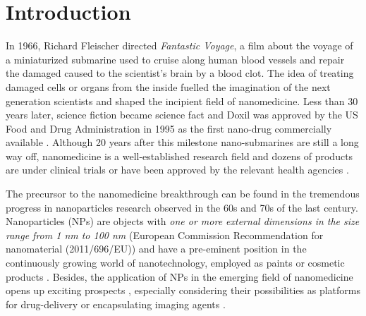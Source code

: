 \chapter{Introduction}
\label{chap:introduction}


In 1966, Richard Fleischer directed \emph{Fantastic Voyage}, a film about the voyage of a miniaturized submarine used to cruise along human blood vessels and repair the damaged caused to the scientist's brain by a blood clot. The idea of treating damaged cells or organs from the inside fuelled the imagination of the next generation scientists and shaped the incipient field of nanomedicine. Less than 30 years later, science fiction became science fact and Doxil was approved by the US Food and Drug Administration in 1995 as the first nano-drug commercially available \citep{barenholz_doxil-first_2012}. Although 20 years after this milestone nano-submarines are still a long way off, nanomedicine is a well-established research field and dozens of products are under clinical trials or have been approved by the relevant health agencies \citep{etheridge_big_2013}.

The precursor to the nanomedicine breakthrough can be found in the tremendous progress in nanoparticles research observed in the 60s and 70s of the last century. Nanoparticles (NPs) are objects with \emph{one or more external dimensions in the size range from 1 nm to 100 nm} (European Commission Recommendation for nanomaterial (2011/696/EU)) and have a pre-eminent position in the continuously growing world of nanotechnology, employed as paints or cosmetic products \citep{guterres_polymeric_2007}. Besides, the application of NPs in the emerging field of nanomedicine opens up exciting prospects \citep{sahoo_nanotech_2003, wickline_nanotechnology_2003, rosen_rise_2005, nie_nanotechnology_2007,zhou_nano-enabled_2014}, especially considering their possibilities as platforms for drug-delivery \citep{wang_nanoparticle_2012} or encapsulating imaging agents \citep{tao_shape-specific_2011}.

